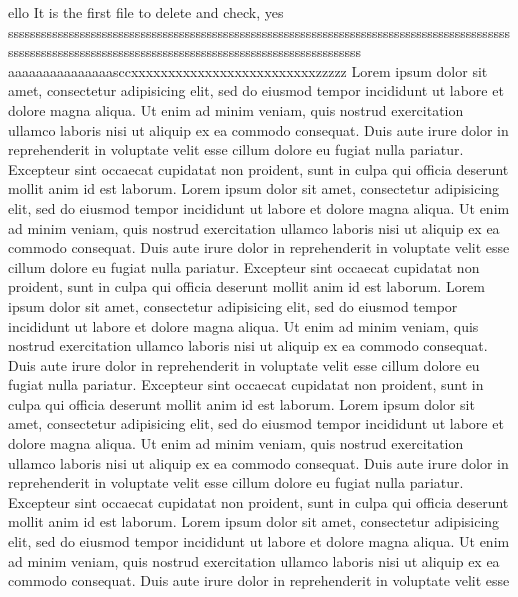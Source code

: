 ello
It is the
first file
to delete and check, yes
\begin{equation}
    
\end{equation}
sssssssssssssssssssssssssssssssssssssssssssssssssssssssssssssssssssssssssssssssssssssssssssssssssssssssssssssssssssssssssssssssssssssssssssssssssssssssssss aaaaaaaaaaaaaaasccxxxxxxxxxxxxxxxxxxxxxxxxxzzzzz
       Lorem ipsum dolor sit amet, consectetur adipisicing elit, sed do eiusmod
       tempor incididunt ut labore et dolore magna aliqua. Ut enim ad minim veniam,
       quis nostrud exercitation ullamco laboris nisi ut aliquip ex ea commodo
       consequat. Duis aute irure dolor in reprehenderit in voluptate velit esse
       cillum dolore eu fugiat nulla pariatur. Excepteur sint occaecat cupidatat non
proident, sunt in culpa qui officia deserunt mollit anim id est laborum.
Lorem ipsum dolor sit amet, consectetur adipisicing elit, sed do eiusmod
tempor incididunt ut labore et dolore magna aliqua. Ut enim ad minim veniam,
       quis nostrud exercitation ullamco laboris nisi ut aliquip ex ea commodo
       consequat. Duis aute irure dolor in reprehenderit in voluptate velit esse
       cillum dolore eu fugiat nulla pariatur. Excepteur sint occaecat cupidatat non
       proident, sunt in culpa qui officia deserunt mollit anim id est laborum.
       Lorem ipsum dolor sit amet, consectetur adipisicing elit, sed do eiusmod
       tempor incididunt ut labore et dolore magna aliqua. Ut enim ad minim veniam,
       quis nostrud exercitation ullamco laboris nisi ut aliquip ex ea commodo
       consequat. Duis aute irure dolor in reprehenderit in voluptate velit esse
       cillum dolore eu fugiat nulla pariatur. Excepteur sint occaecat cupidatat non
       proident, sunt in culpa qui officia deserunt mollit anim id est laborum.
       Lorem ipsum dolor sit amet, consectetur adipisicing elit, sed do eiusmod
       tempor incididunt ut labore et dolore magna aliqua. Ut enim ad minim veniam,
       quis nostrud exercitation ullamco laboris nisi ut aliquip ex ea commodo
       consequat. Duis aute irure dolor in reprehenderit in voluptate velit esse
       cillum dolore eu fugiat nulla pariatur. Excepteur sint occaecat cupidatat non
       proident, sunt in culpa qui officia deserunt mollit anim id est laborum.
       Lorem ipsum dolor sit amet, consectetur adipisicing elit, sed do eiusmod
       tempor incididunt ut labore et dolore magna aliqua. Ut enim ad minim veniam,
       quis nostrud exercitation ullamco laboris nisi ut aliquip ex ea commodo
       consequat. Duis aute irure dolor in reprehenderit in voluptate velit esse
